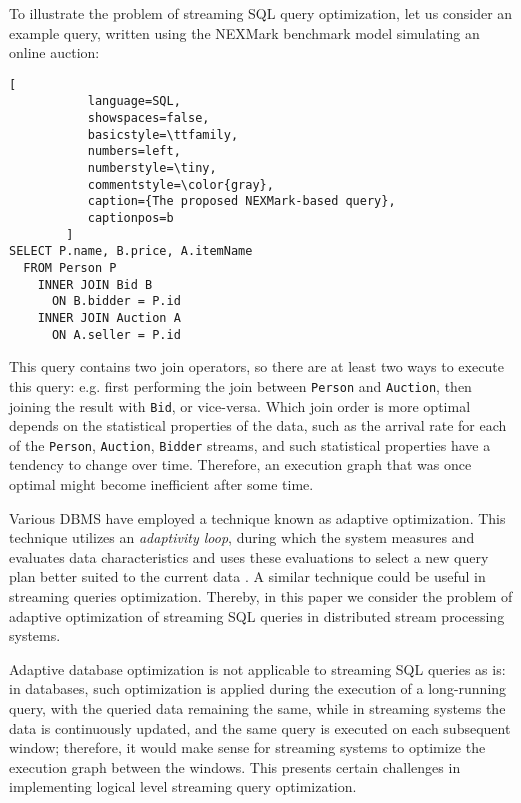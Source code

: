 \label {sec:fs-optimization-problem-statement}

To illustrate the problem of streaming SQL query optimization, let us consider an example query, written using the NEXMark \cite{tucker2008nexmark} benchmark model simulating an online auction:

    \begin{lstlisting}[
           language=SQL,
           showspaces=false,
           basicstyle=\ttfamily,
           numbers=left,
           numberstyle=\tiny,
           commentstyle=\color{gray},
           caption={The proposed NEXMark-based query}, 
           captionpos=b
        ]
SELECT P.name, B.price, A.itemName 
  FROM Person P 
    INNER JOIN Bid B 
      ON B.bidder = P.id 
    INNER JOIN Auction A 
      ON A.seller = P.id
\end{lstlisting}

This query contains two join operators, so there are at least two ways to execute this query: e.g. first performing the join between \texttt{Person} and \texttt{Auction}, then joining the result with \texttt{Bid}, or vice-versa. Which join order is more optimal depends on the statistical properties of the data, such as the arrival rate for each of the \texttt{Person}, \texttt{Auction}, \texttt{Bidder} streams, and such statistical properties have a tendency to change over time. Therefore, an execution graph that was once optimal might become inefficient after some time.

Various DBMS have employed a technique known as adaptive optimization. This technique utilizes an \textit{adaptivity loop}, during which the system measures and evaluates data characteristics and uses these evaluations to select a new query plan better suited to the current data \cite{deshpande2007adaptive}. A similar technique could be useful in streaming queries optimization. Thereby, in this paper we consider the problem of adaptive optimization of streaming SQL queries in distributed stream processing systems. 

Adaptive database optimization is not applicable to streaming SQL queries as is: in databases, such optimization is applied during the execution of a long-running query, with the queried data remaining the same, while in streaming systems the data is continuously updated, and the same query is executed on each subsequent window; therefore, it would make sense for streaming systems to optimize the execution graph between the windows. This presents certain challenges in implementing logical level streaming query optimization.

